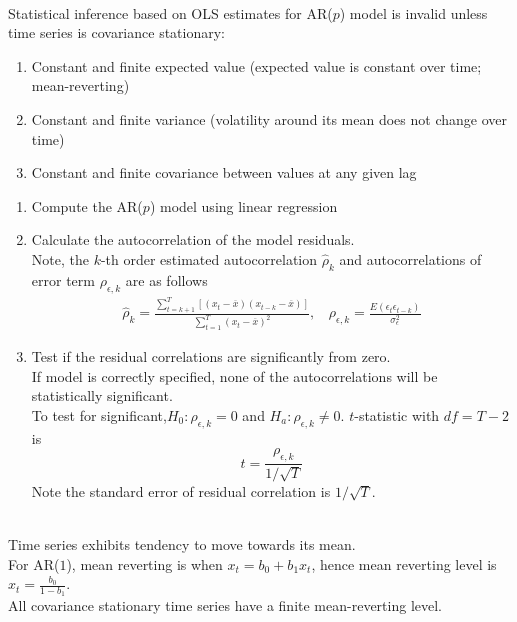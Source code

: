 \begin{definition} \\
Statistical inference based on OLS estimates for AR($p$) model is invalid unless time series is covariance stationary:
\begin{enumerate}[label=\roman*.]
\setlength{\itemsep}{0pt}
\item Constant and finite expected value (expected value is constant over time; mean-reverting)
\item Constant and finite variance (volatility around its mean does not change over time)
\item Constant and finite covariance between values at any given lag
\end{enumerate}
\end{definition}

\begin{remark} 
\begin{enumerate}[label=\roman*.]
\setlength{\itemsep}{0pt}
\item Compute the AR($p$) model using linear regression
\item Calculate the autocorrelation of the model residuals.\\
Note, the $k$-th order estimated autocorrelation $\hat{\rho}_k$ and autocorrelations of error term $\rho_{\epsilon, k}$ are as follows
\begin{align}
\hat{\rho}_k = \frac{\sum\limits_{t=k+1}^T [(x_t - \overline{x}) (x_{t-k} - \overline{x})]}{\sum\limits_{t=1}^T (x_t - \overline{x})^2}, \ \ \ \ \rho_{\epsilon, k} = \frac{E(\epsilon_t \epsilon_{t-k})}{\sigma_{\epsilon}^2} \nonumber
\end{align}
\item Test if the residual correlations are significantly from zero.\\
If model is correctly specified, none of the autocorrelations will be statistically significant.\\
To test for significant,$H_0: \rho_{\epsilon, k} = 0$ and $H_a: \rho_{\epsilon, k} \neq 0$.  $t$-statistic with $df = T-2$ is
\begin{equation}
t = \frac{\rho_{\epsilon, k}}{1/\sqrt{T}} \nonumber
\end{equation}
Note the standard error of residual correlation is $1/\sqrt{T}$.
\end{enumerate}
\end{remark}

\begin{remark} \\
Time series exhibits tendency to move towards its mean.\\
For AR($1$), mean reverting is when $x_t = b_0 + b_1 x_t$, hence mean reverting level is $x_t = \frac{b_0}{1-b_1}$.\\
All covariance stationary time series have a finite mean-reverting level.
\end{remark}

